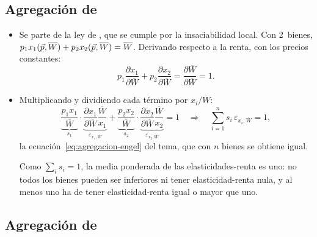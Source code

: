 \documentclass[11pt]{article}
\begin{document}
\subsection{Agregación de }\label{der:engel}

\begin{itemize}
\item Se parte de la ley de , que se cumple por la insaciabilidad local. Con 2~bienes, $p_1x_1(\vec{p},\overline{W})+p_2x_2(\vec{p},\overline{W})=\overline{W}$. Derivando respecto a la renta, con los precios constantes:
  \begin{equation*}
  p_1\frac{\partial x_1}{\partial\overline{W}}+p_2\frac{\partial x_2}{\partial\overline{W}}=\frac{\partial\overline{W}}{\partial\overline{W}}=1.
  \end{equation*}
\item Multiplicando y dividiendo cada término por $x_i/\overline{W}$:
  \begin{equation*}
  \underbrace{\frac{p_1x_1}{\overline{W}}}_{s_1}\cdot\underbrace{\frac{\partial x_1}{\partial\overline{W}}\frac{\overline{W}}{x_1}}_{\varepsilon_{x_1,\overline{W}}}+\underbrace{\frac{p_2x_2}{\overline{W}}}_{s_2}\cdot\underbrace{\frac{\partial x_2}{\partial\overline{W}}\frac{\overline{W}}{x_2}}_{\varepsilon_{x_2,\overline{W}}}=1\quad\Longrightarrow\quad\sum_{i=1}^{n}s_i\,\varepsilon_{x_i,\overline{W}}=1,
  \end{equation*}
  la ecuación~\eqref{eq:agregacion-engel} del tema, que con $n$ bienes se obtiene igual.\findemo

  Como $\sum_i s_i=1$, la media ponderada de las elasticidades-renta es uno: no todos los bienes pueden ser inferiores ni tener elasticidad-renta nula, y al menos uno ha de tener elasticidad-renta igual o mayor que uno.
\end{itemize}

\subsection{Agregación de }\label{der:cournot}
\end{document}
